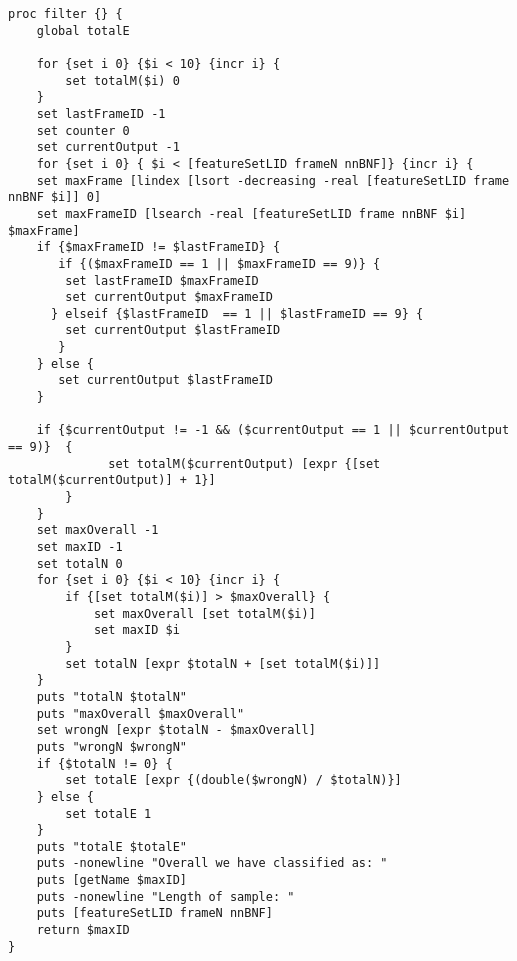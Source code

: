\begin{lstlisting}[label=lst:2LFilter,caption=2-Language Filter (For DE/EN) employed to smooth/improve output]
proc filter {} {
    global totalE

    for {set i 0} {$i < 10} {incr i} {
        set totalM($i) 0
    }
    set lastFrameID -1
    set counter 0
    set currentOutput -1
    for {set i 0} { $i < [featureSetLID frameN nnBNF]} {incr i} {
    set maxFrame [lindex [lsort -decreasing -real [featureSetLID frame nnBNF $i]] 0]
    set maxFrameID [lsearch -real [featureSetLID frame nnBNF $i] $maxFrame]
    if {$maxFrameID != $lastFrameID} {
       if {($maxFrameID == 1 || $maxFrameID == 9)} {
        set lastFrameID $maxFrameID
        set currentOutput $maxFrameID
      } elseif {$lastFrameID  == 1 || $lastFrameID == 9} {
        set currentOutput $lastFrameID
       }
    } else {
       set currentOutput $lastFrameID
    }

    if {$currentOutput != -1 && ($currentOutput == 1 || $currentOutput == 9)}  {
              set totalM($currentOutput) [expr {[set totalM($currentOutput)] + 1}]
        }
    }
    set maxOverall -1
    set maxID -1
    set totalN 0
    for {set i 0} {$i < 10} {incr i} {
        if {[set totalM($i)] > $maxOverall} {
            set maxOverall [set totalM($i)]
            set maxID $i
        }
        set totalN [expr $totalN + [set totalM($i)]]
    }
    puts "totalN $totalN"
    puts "maxOverall $maxOverall"
    set wrongN [expr $totalN - $maxOverall]
    puts "wrongN $wrongN"
    if {$totalN != 0} {
        set totalE [expr {(double($wrongN) / $totalN)}]
    } else {
        set totalE 1
    }
    puts "totalE $totalE"
    puts -nonewline "Overall we have classified as: "
    puts [getName $maxID]
    puts -nonewline "Length of sample: "
    puts [featureSetLID frameN nnBNF]
    return $maxID
}
\end{lstlisting}

